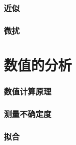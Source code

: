 \documentclass[10pt]{article}
\begin{document}
		\section{近似}
		\section{微扰}

	\part{数值的分析}
		\section{数值计算原理}
		\section{测量不确定度}
		\section{拟合}
\end{document}
